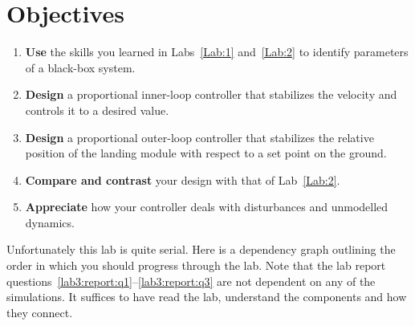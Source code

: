 \section{Objectives}
\begin{enumerate}[label=(\arabic*)]
  \item{
    \textbf{Use} the skills you learned in Labs~\ref{Lab:1} and~\ref{Lab:2}
    to identify parameters of a black-box system.
  }
  \item{
    \textbf{Design} a proportional inner-loop controller that stabilizes the velocity and controls it to a desired value.
  }
  \item{
    \textbf{Design} a proportional outer-loop controller that stabilizes the relative position of the landing module with respect to a set point on the ground.
  }
  \item{
    \textbf{Compare and contrast} your design with that of Lab~\ref{Lab:2}.
  }
  \item{
    \textbf{Appreciate} how your controller deals with disturbances and unmodelled dynamics.
  }
\end{enumerate}
Unfortunately this lab is quite serial.
Here is a dependency graph outlining the order in which you should progress through the lab.
Note that the lab report questions~\ref{lab3:report:q1}--\ref{lab3:report:q3} are not dependent on any of the simulations.
It suffices to have read the lab, understand the components and how they connect. 
